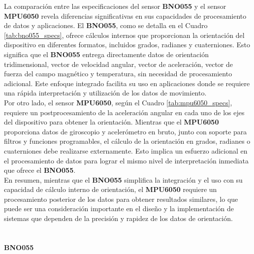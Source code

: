     La comparación entre las especificaciones del sensor \textbf{BNO055} y el sensor \textbf{MPU6050} revela diferencias significativas en sus capacidades de procesamiento de datos y aplicaciones. El \textbf{BNO055}, como se detalla en el Cuadro \ref{tab:bno055_specs}, ofrece cálculos internos que proporcionan la orientación del dispositivo en diferentes formatos, incluidos grados, radianes y cuaterniones. Esto significa que el \textbf{BNO055} entrega directamente datos de orientación tridimensional, vector de velocidad angular, vector de aceleración, vector de fuerza del campo magnético y temperatura, sin necesidad de procesamiento adicional. Este enfoque integrado facilita su uso en aplicaciones donde se requiere una rápida interpretación y utilización de los datos de movimiento.  \\ 
    
    Por otro lado, el sensor \textbf{MPU6050}, según el Cuadro \ref{tab:mpu6050_specs}, requiere un postprocesamiento de la aceleración angular en cada uno de los ejes del dispositivo para obtener la orientación. Mientras que el \textbf{MPU6050} proporciona datos de giroscopio y acelerómetro en bruto, junto con soporte para filtros y funciones programables, el cálculo de la orientación en grados, radianes o cuaterniones debe realizarse externamente. Esto implica un esfuerzo adicional en el procesamiento de datos para lograr el mismo nivel de interpretación inmediata que ofrece el \textbf{BNO055}. \\ 
    
    En resumen, mientras que el \textbf{BNO055} simplifica la integración y el uso con su capacidad de cálculo interno de orientación, el \textbf{MPU6050} requiere un procesamiento posterior de los datos para obtener resultados similares, lo que puede ser una consideración importante en el diseño y la implementación de sistemas que dependen de la precisión y rapidez de los datos de orientación.\\ \\ 

    
    \paragraph{\textbf{\textbf{BNO055}}}  \\ \\


